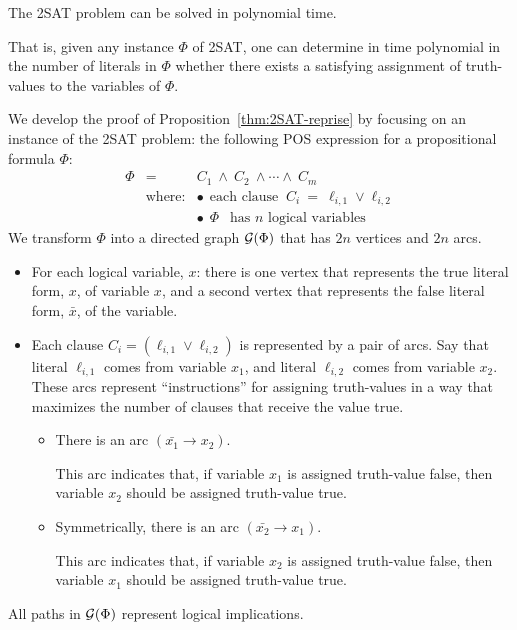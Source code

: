 \begin{prop}
\label{thm:2SAT-reprise}
The {\sf 2SAT} problem can be solved in polynomial time.

\noindent
That is, given any instance $\Phi$ of {\sf 2SAT}, one can determine in
time polynomial in the number of literals in $\Phi$ whether there
exists a satisfying assignment of truth-values to the variables of
$\Phi$.
\end{prop}

We develop the proof of Proposition~\ref{thm:2SAT-reprise} by focusing
on an instance of the {\sf 2SAT} problem: the following POS expression
for a propositional formula $\Phi$:
\begin{eqnarray}
\label{eq:Phi-2SAT}
\Phi & = & C_1 \ \wedge \ C_2 \ \wedge \cdots \wedge \ C_m \\
\nonumber
  & \mbox{where:} & \bullet \ \ \mbox{each clause }
 \ C_i \ = \ \ell_{i,1} \vee \ell_{i,2} \\
\nonumber
  &               & \bullet \ \ \Phi \ \ \mbox{ has $n$ logical variables}
\end{eqnarray}
We transform $\Phi$ into a directed graph $\mbox{$\cal G$}(\Phi)$ that has $2n$
vertices and $2n$ arcs.
\begin{itemize}
\item
For each logical variable, $x$: there is one vertex that represents
the {\sc true} literal form, $x$, of variable $x$, and a second vertex
that represents the {\sc false} literal form, $\bar{x}$, of the
variable.
\item
Each clause $C_i = (\ell_{i,1} \vee \ell_{i,2})$ is represented by a
pair of arcs.  Say that literal $\ell_{i,1}$ comes from variable
$x_1$, and literal $\ell_{i,2}$ comes from variable $x_2$.  These arcs
represent ``instructions'' for assigning truth-values in a way that
maximizes the number of clauses that receive the value {\sc true}.
  \begin{itemize}
  \item
There is an arc $(\bar{x_1} \rightarrow x_2)$.

This arc indicates that, if variable $x_1$ is assigned truth-value
{\sc false}, then variable $x_2$ should be assigned truth-value {\sc
  true}.
  \item
Symmetrically, there is an arc $(\bar{x_2} \rightarrow x_1)$.

This arc indicates that, if variable $x_2$ is assigned truth-value
{\sc false}, then variable $x_1$ should be assigned truth-value {\sc
  true}.
  \end{itemize}
\end{itemize}
All paths in $\mbox{$\cal G$}(\Phi)$ represent logical implications. 

